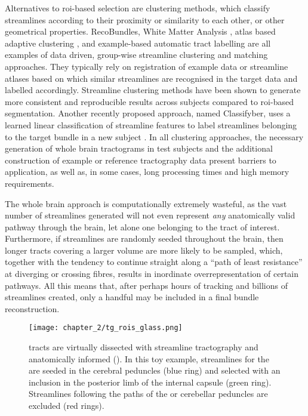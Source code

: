\documentclass[12pt,phd,a4paper,twoside]{ucl_thesis}
\begin{document}
Alternatives to \gls{roi}-based selection are clustering methods, which classify streamlines according to their proximity or similarity to each other, or other geometrical properties.
RecoBundles\autocite{Garyfallidis2018}, White Matter Analysis \autocite{ODonnell2017, ODonnell2007}, atlas based adaptive clustering \autocite{Tunc2014}, and example-based automatic tract labelling \autocite{Yoo2015} are all examples of data driven, group-wise streamline clustering and matching approaches.
They typically rely on registration of example data or streamline atlases based on which similar streamlines are recognised in the target data and labelled accordingly.
Streamline clustering methods have been shown to generate more consistent and reproducible results across subjects compared to \gls{roi}-based segmentation\autocite{Sydnor2018}.
Another recently proposed approach, named Classifyber, uses a learned linear classification of streamline features to label streamlines belonging to the target bundle in a new subject \autocite{Berto2021}.
In all clustering approaches, the necessary generation of whole brain tractograms in test subjects and the additional construction of example or reference tractography data present barriers to application, as well as, in some cases, long processing times and high memory requirements\autocite{Wasserthal2018}.

The whole brain approach is computationally extremely wasteful, as the vast number of streamlines generated will not even represent \textit{any} anatomically valid pathway through the brain, let alone one belonging to the tract of interest.
Furthermore, if streamlines are randomly seeded throughout the brain, then longer tracts covering a larger volume are more likely to be sampled, which, together with the tendency to continue straight along a ``path of least resistance'' at diverging or crossing fibres, results in inordinate overrepresentation of certain pathways\autocite{Smith2013}.
All this means that, after perhaps hours of tracking and billions of streamlines created, only a handful may be included in a final bundle reconstruction.

\begin{SCfigure}
  \texttt{[image: chapter\_2/tg\_rois\_glass.png]}
  \caption[Virtual WM tract dissection with streamline tractography]{ tracts are virtually dissected with streamline tractography and anatomically informed  (). In this toy example, streamlines for the  are seeded in the cerebral peduncles (blue ring) and selected with an inclusion  in the posterior limb of the internal capsule (green ring). Streamlines following the paths of the  or cerebellar peduncles are excluded (red rings).}
  \label{fig:tg_rois}
\end{SCfigure}
\end{document}
